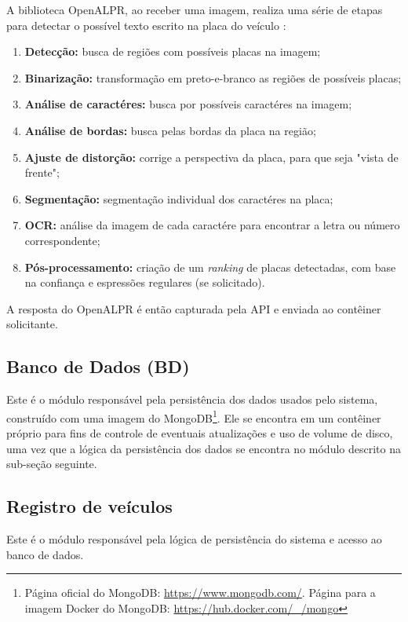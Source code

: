 \documentclass[12pt]{article}
\begin{document}
A biblioteca OpenALPR, ao receber uma imagem, realiza uma série de etapas para detectar o possível texto escrito na placa do veículo \cite{openalprdesign}:

\begin{enumerate}
	\item \textbf{Detecção:} busca de regiões com possíveis placas na imagem;
	\item \textbf{Binarização:} transformação em preto-e-branco as regiões de possíveis placas;
	\item \textbf{Análise de caractéres:} busca por possíveis caractéres na imagem;
	\item \textbf{Análise de bordas:} busca pelas bordas da placa na região;
	\item \textbf{Ajuste de distorção:} corrige a perspectiva da placa, para que seja "vista de frente";
	\item \textbf{Segmentação:} segmentação individual dos caractéres na placa;
	\item \textbf{OCR:} análise da imagem de cada caractére para encontrar a letra ou número correspondente;
	\item \textbf{Pós-processamento:} criação de um \textit{ranking} de placas detectadas, com base na confiança e espressões regulares (se solicitado).
\end{enumerate}

A resposta do OpenALPR é então capturada pela API e enviada ao contêiner solicitante.

\subsection{Banco de Dados (BD)}

Este é o módulo responsável pela persistência dos dados usados pelo sistema, construído com uma imagem do MongoDB\footnote{Página oficial do MongoDB: \url{https://www.mongodb.com/}. Página para a imagem Docker do MongoDB: \url{https://hub.docker.com/_/mongo}}. Ele se encontra em um contêiner próprio para fins de controle de eventuais atualizações e uso de volume de disco, uma vez que a lógica da persistência dos dados se encontra no módulo descrito na sub-seção seguinte.

\subsection{Registro de veículos}

Este é o módulo responsável pela lógica de persistência do sistema e acesso ao banco de dados.
\end{document}

